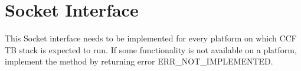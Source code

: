 \hypertarget{group__socket}{}\section{Socket Interface}
\label{group__socket}
This Socket interface needs to be implemented for every platform on which C\+C\+F T\+B stack is expected to run. If some functionality is not available on a platform, implement the method by returning error E\+R\+R\+\_\+\+N\+O\+T\+\_\+\+I\+M\+P\+L\+E\+M\+E\+N\+T\+E\+D. 